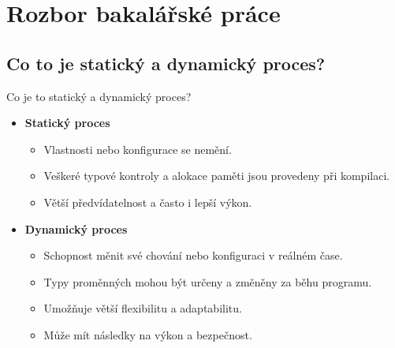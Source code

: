 \documentclass{beamer}
\begin{document}
\section{Rozbor bakalářské práce}
\subsection{Co to je statický a dynamický proces?}
\begin{frame}{Co je to statický a dynamický proces?}
	\begin{itemize}
		\item \textbf{Statický proces}
			\begin{itemize}
				\item[\textendash] Vlastnosti nebo konfigurace se nemění.
				\item[\textendash] Veškeré typové kontroly a alokace paměti jsou provedeny při kompilaci.
				\item[\textendash] Větší předvídatelnost a často i lepší výkon.
			\end{itemize}
		\item \textbf{Dynamický proces}
			\begin{itemize}
				\item[\textendash] Schopnost měnit své chování nebo konfiguraci v reálném čase.
				\item[\textendash] Typy proměnných mohou být určeny a změněny za běhu programu.
				\item[\textendash] Umožňuje větší flexibilitu a adaptabilitu.
				\item[\textendash] Může mít následky na výkon a bezpečnost.
			\end{itemize}
	\end{itemize}

\end{frame}
\end{document}
